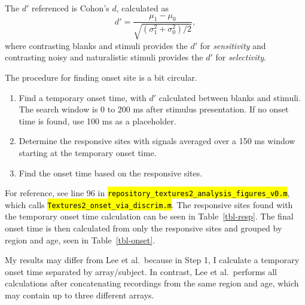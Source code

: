 \documentclass[
  10pt,
  letterpaper,
  DIV=11,
  numbers=noendperiod]{scrartcl}
\providecommand{\tightlist}{%
  \setlength{\itemsep}{0pt}\setlength{\parskip}{0pt}}
\let\OldTexttt\texttt
\renewcommand{\texttt}[1]{\OldTexttt{\hl{#1}}}
\begin{document}
The \(d'\) referenced is Cohon's \(d\), calculated as \[
d' = \dfrac{\mu_1 - \mu_0}{\sqrt{(\sigma^2_1 + \sigma^2_0)/2}},
\] where contrasting blanks and stimuli provides the \(d'\) for
\emph{sensitivity} and contrasting noisy and naturalistic stimuli
provides the \(d'\) for \emph{selectivity}.

The procedure for finding onset site is a bit circular.

\begin{enumerate}
\def\labelenumi{\arabic{enumi}.}
\tightlist
\item
  Find a temporary onset time, with \(d'\) calculated between blanks and
  stimuli. The search window is 0 to 200 ms after stimulus presentation.
  If no onset time is found, use 100 ms as a placeholder.
\item
  Determine the responsive sites with signals averaged over a 150 ms
  window starting at the temporary onset time.
\item
  Find the onset time based on the responsive sites.
\end{enumerate}

For reference, see line 96 in
\texttt{repository\_textures2\_analysis\_figures\_v0.m}, which calls
\texttt{Textures2\_onset\_via\_discrim.m}. The responsive sites found
with the temporary onset time calculation can be seen in
Table~\ref{tbl-resp}. The final onset time is then calculated from only
the responsive sites and grouped by region and age, seen in
Table~\ref{tbl-onset}.

My results may differ from Lee et al.~because in Step 1, I calculate a
temporary onset time separated by array/subject. In contrast, Lee et
al.~performs all calculations after concatenating recordings from the
same region and age, which may contain up to three different arrays.
\end{document}
